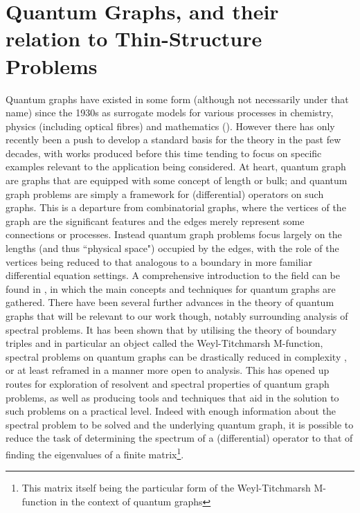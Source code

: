 \section{Quantum Graphs, and their relation to Thin-Structure Problems} \label{sec:GraphLitReview}
Quantum graphs have existed in some form (although not necessarily under that name) since the 1930s \cite{berkolaiko2013introduction} as surrogate models for various processes in chemistry, physics (including optical fibres) and mathematics ().
However there has only recently been a push to develop a standard basis for the theory in the past few decades, with works produced before this time tending to focus on specific examples relevant to the application being considered.
At heart, quantum graph are graphs that are equipped with some concept of length or bulk; and quantum graph problems are simply a framework for (differential) operators on such graphs.
This is a departure from combinatorial graphs, where the vertices of the graph are the significant features and the edges merely represent some connections or processes.
Instead quantum graph problems focus largely on the lengths (and thus ``physical space") occupied by the edges, with the role of the vertices being reduced to that analogous to a boundary in more familiar differential equation settings.
A comprehensive introduction to the field can be found in \cite{berkolaiko2013introduction}, in which the main concepts and techniques for quantum graphs are gathered.
There have been several further advances in the theory of quantum graphs that will be relevant to our work though, notably surrounding analysis of spectral problems. 
It has been shown that by utilising the theory of boundary triples  and in particular an object called the Weyl-Titchmarsh M-function, spectral problems on quantum graphs can be drastically reduced in complexity , or at least reframed in a manner more open to analysis.
This has opened up routes for exploration of resolvent and spectral properties of quantum graph problems, as well as producing tools and techniques that aid in the solution to such problems on a practical level.
Indeed with enough information about the spectral problem to be solved and the underlying quantum graph, it is possible to reduce the task of determining the spectrum of a (differential) operator to that of finding the eigenvalues of a finite matrix\footnote{This matrix itself being the particular form of the Weyl-Titchmarsh M-function in the context of quantum graphs}.
